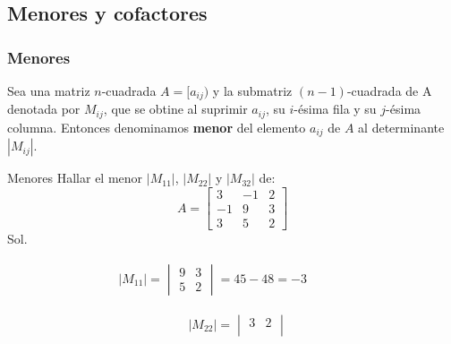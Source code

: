 \subsection*{Menores y cofactores}
\subsubsection*{Menores}
Sea una matriz $n$-cuadrada $A=[a_{ij})$ y la submatriz $(n-1)$-cuadrada de A denotada por $M_{ij}$, que se obtine al suprimir $a_{ij}$, su $i$-ésima fila y su $j$-ésima columna. Entonces denominamos \textbf{menor} del elemento $a_{ij}$ de $A$ al determinante $|M_{ij}|$.
\begin{Example*} {Menores}
	Hallar el menor $|M_{11}|$, $|M_{22}|$ y $|M_{32}|$ de:
	$$ A=\begin{bmatrix}
		3&-1&2\\
		-1&9&3\\
		3&5&2
	\end{bmatrix} $$
	Sol. \\
	\begin{align*}
		&|M_{11}|=\begin{vmatrix}
			9&3\\
			5&2
		\end{vmatrix}=45-48=-3 \quad\quad\quad\quad
	\end{align*}
	\begin{align*}
		&|M_{22}|=\begin{vmatrix}
			3&2\\

\end{vmatrix}
\end{align*}
\end{Example*}

